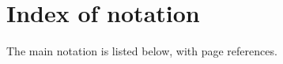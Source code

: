\chapter*{Index of notation}

The main notation is listed below, with page references.

\begingroup
\setlength{\LTleft}{0pt}
\setlength{\LTright}{0pt plus 1fill}
\renewcommand{\arraystretch}{1.03}
\newenvironment{notationtable}{%
    \small
    \longtable{@{}p{0.31\linewidth}@{\hspace{0.02\linewidth}}p{0.57\linewidth}@{\hspace{0.02\linewidth}}r@{}}
    \textbf{Notation} & \textbf{Meaning} & \textbf{Page} \\
    \hline
    \endhead
}{\endlongtable}

